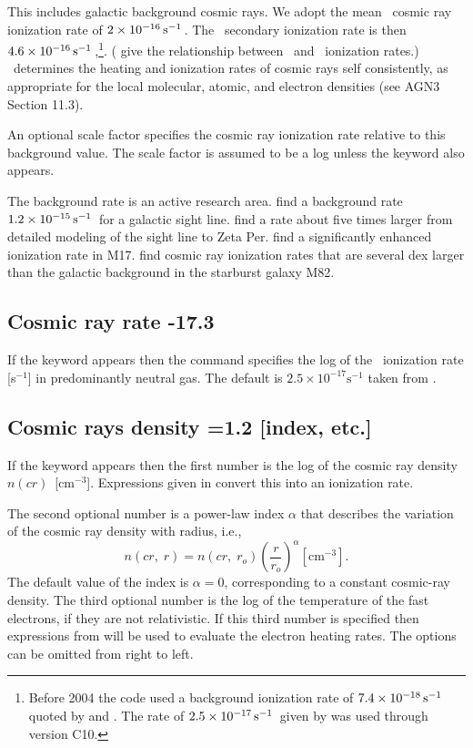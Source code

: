 This includes galactic background cosmic rays.
We adopt the \citet{Indriolo2007} mean \hO\ cosmic ray ionization rate 
of $2\times 10^{-16} \mbox{${\rm\thinspace s}^{-1}\,$}$.
The \htwo\ secondary ionization
rate is then $4.6\times 10^{-16} \mbox{${\rm\thinspace s}^{-1}\,$}$,\footnote{Before 2004 the code used a
background ionization rate of $7.4\times 10^{-18} \mbox{${\rm\thinspace s}^{-1}\,$}$
quoted by \citet[Table 10]{Tielens1985a}
and \citet{McKee1999}.
The rate of $2.5\times 10^{-17} \mbox{${\rm\thinspace s}^{-1}\,$}$ given by \citet{Williams1998} was used through
version C10.}.
(\citet{Glassgold.A74Model-calculations-for-diffuse-molecular} give the
relationship between \hO\ and \htwo\ ionization rates.)
\Cloudy\ determines the heating and
ionization rates of cosmic rays self consistently,
as appropriate for the
local molecular, atomic, and electron densities
(see AGN3 Section 11.3).

An optional scale factor specifies the cosmic ray ionization rate
relative to this background value.
The scale factor is assumed to be a
log unless the keyword  also appears.

The background rate is an active research area.
\citet{McCall2003} find a background rate
$1.2 \times 10^{-15} \mbox{${\rm\thinspace s}^{-1}\,$}$ for a galactic
sight line.
\citet{Shaw2008} find a rate about five times larger from detailed
modeling of the sight line to Zeta Per.
\citet{Pellegrini2007} find a significantly enhanced ionization rate in M17.
\citet{Suchkov1993} find cosmic ray ionization rates that are
several dex larger than the galactic background in the starburst galaxy M82. 

\subsection{Cosmic ray rate -17.3}

If the keyword  appears then the command specifies
the log of the
\hO\ ionization rate [s$^{-1}$] in predominantly neutral gas.
The default is
$2.5\times 10^{-17} \mathrm{s}^{-1}$ taken from \citet{Williams1998}.

\subsection{Cosmic rays density =1.2 [index, etc.]}

If the keyword  appears then the first number
is the log of the
cosmic ray density $n(cr)$~[cm$^{-3}$].
Expressions given in \citet{FerlandMushotzky1984} convert this into an ionization rate.

The second optional number is a power-law index $\alpha $ that
describes the
variation of the cosmic ray density with radius, i.e.,
\begin{equation}
n\left( {cr,\;r} \right) = n\left( {cr,\;r_o } \right)\left( {\frac{r}{{r_o
}}} \right)^\alpha
 [\mathrm{cm}^{-3}]  .
\end{equation}
The default value of the index is  $\alpha =0$,
corresponding to a constant cosmic-ray density.
The third optional number is the log of the temperature of
the fast electrons, if they are not relativistic.
If this third number
is specified then expressions from \citet{Balbus1982} will be used
to evaluate the electron heating rates.
The options can be omitted from right to left.

